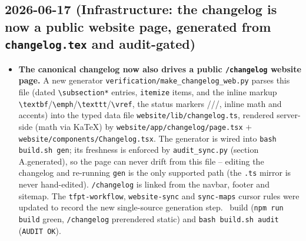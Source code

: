 \subsection*{2026-06-17 (Infrastructure: the changelog is now a public website page, generated from \texttt{changelog.tex} and audit-gated)}
\begin{itemize}
\item \textbf{The canonical changelog now also drives a public \texttt{/changelog} website page.}
  A new generator \texttt{verification/make\_changelog\_web.py} parses this file (dated
  \texttt{\textbackslash subsection*} entries, \texttt{itemize} items, and the inline markup
  \texttt{\textbackslash textbf}/\texttt{\textbackslash emph}/\texttt{\textbackslash texttt}/\texttt{\textbackslash vref},
  the status markers \mE/\mC/\mO/\mX, inline math and accents) into the typed data file
  \texttt{website/\allowbreak lib/\allowbreak changelog.ts}, rendered server-side (math via KaTeX) by
  \texttt{website/\allowbreak app/\allowbreak changelog/\allowbreak page.tsx} $+$ \texttt{website/\allowbreak components/\allowbreak Changelog.tsx}. The
  generator is wired into \texttt{bash build.sh gen}; its freshness is enforced by
  \texttt{audit\_sync.py} (section A.generated), so the page can never drift from this file --
  editing the changelog and re-running \texttt{gen} is the only supported path (the \texttt{.ts}
  mirror is never hand-edited). \texttt{/changelog} is linked from the navbar, footer and sitemap.
  The \texttt{tfpt-workflow}, \texttt{website-sync} and \texttt{sync-maps} cursor rules were updated
  to record the new single-source generation step. \mE\ build (\texttt{npm run build} green,
  \texttt{/changelog} prerendered static) and \texttt{bash build.sh audit} (\texttt{AUDIT OK}).
\end{itemize}

